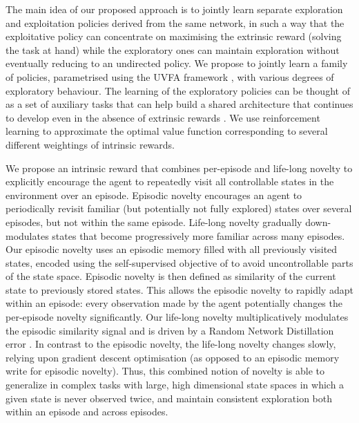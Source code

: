 \documentclass{article} \usepackage{iclr2020_conference,times}
\begin{document}
The main idea of our proposed approach is to jointly learn separate exploration and exploitation policies derived from the same network, in such a way that the exploitative policy can concentrate on maximising the extrinsic reward (solving the task at hand) while the exploratory ones can maintain exploration without eventually reducing to an undirected policy. 
We propose to jointly learn a family of policies, parametrised using the UVFA framework \citep{schaul2015universal}, with various degrees of exploratory behaviour. 
The learning of the exploratory policies can be thought of as a set of auxiliary tasks that can help build a shared architecture that continues to develop even in the absence of extrinsic rewards \citep{jaderberg2016reinforcement}.
We use reinforcement learning to approximate the optimal value function corresponding to several different weightings of intrinsic rewards.

We propose an intrinsic reward that combines per-episode and life-long novelty to explicitly encourage the agent to repeatedly visit all controllable states in the environment over an episode.
Episodic novelty encourages an agent to periodically revisit familiar (but potentially not fully explored) states over several episodes, but not within the same episode.
Life-long novelty gradually down-modulates states that become progressively more familiar across many episodes.
Our episodic novelty uses an episodic memory filled with all previously visited states, encoded using the self-supervised objective of \citet{pathak2017curiosity} to avoid uncontrollable parts of the state space.
Episodic novelty is then defined as similarity of the current state to previously stored states.
This allows the episodic novelty to rapidly adapt within an episode: every observation made by the agent potentially changes the per-episode novelty significantly.
Our life-long novelty multiplicatively modulates the episodic similarity signal and is driven by a Random Network Distillation error \citep{burda2018exploration}.
In contrast to the episodic novelty, the life-long novelty changes slowly, relying upon gradient descent optimisation (as opposed to an episodic memory write for episodic novelty).
Thus, this combined notion of novelty is able to generalize in complex tasks with large, high dimensional state spaces in which a given state is never observed twice, and maintain consistent exploration both within an episode and across episodes.
\end{document}
